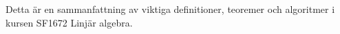 Detta är en sammanfattning av viktiga definitioner, teoremer och algoritmer i kursen SF1672 Linjär algebra.